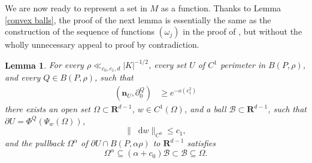 \documentclass[reqno,11pt]{amsart}
\newcommand{\RR}{\mathbf{R}}
\newcommand*\dif{\mathop{}\!\mathrm{d}}
\newcommand{\normal}{\mathbf n}
\newtheorem{lemma}[theorem]{Lemma}
\theoremstyle{definition}
\numberwithin{equation}{section}
\begin{document}
We are now ready to represent a set in $M$ as a function.
Thanks to Lemma \ref{convex balls}, the proof of the next lemma is essentially the same as the construction of the sequence of functions $(\omega_j)$ in the proof of \cite[Lemma 6.4]{Giusti77}, but without the wholly unnecessary appeal to proof by contradiction.

\begin{lemma}\label{rep as a good graph}
For every $\rho \ll_{c_0, c_1, d} |K|^{-1/2}$, every set $U$ of $C^1$ perimeter in $B(P, \rho)$, and every $Q \in B(P, \rho)$, such that
\begin{align}
(\normal_U, \partial_0^Q) &\geq e^{-o(c_1^2)} \label{rep as a good graph hyp}
\end{align}
there exists an open set $\Omega \subset \RR^{d - 1}$, $w \in C^1(\Omega)$, and a ball $\mathscr B \subset \RR^{d - 1}$, such that $\partial U = \Phi^Q(\Psi_w(\Omega))$,
\begin{equation}\label{rep as a good graph small derivative}
\|\dif w\|_{C^0} \leq c_1,
\end{equation}
and the pullback $\Omega^\alpha$ of $\partial U \cap B(P, \alpha \rho)$ to $\RR^{d - 1}$ satisfies
\begin{equation}\label{rep as a good graph set nests}
    \Omega^\alpha \subseteq (\alpha + c_0) \mathscr B \subset \mathscr B \subseteq \Omega.
\end{equation}
\end{lemma}
\end{document}

